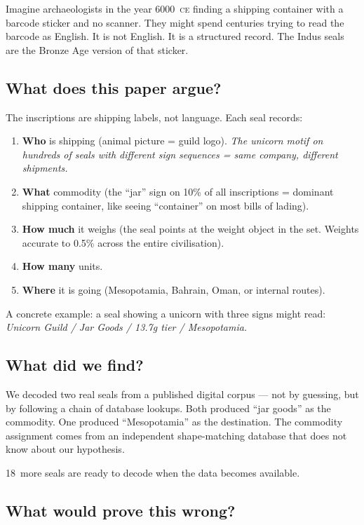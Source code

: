 Imagine archaeologists in the year 6000~\textsc{ce} finding a
shipping container with a barcode sticker and no scanner. They
might spend centuries trying to read the barcode as English. It is
not English. It is a structured record. The Indus seals are the
Bronze Age version of that sticker.

\subsection{What does this paper argue?}

The inscriptions are shipping labels, not language. Each seal
records:

\begin{enumerate}
\item \textbf{Who} is shipping (animal picture = guild logo).
  \textit{The unicorn motif on hundreds of seals with different
  sign sequences = same company, different shipments.}
\item \textbf{What} commodity (the ``jar'' sign on 10\% of all
  inscriptions = dominant shipping container, like seeing
  ``container'' on most bills of lading).
\item \textbf{How much} it weighs (the seal points at the weight
  object in the set. Weights accurate to 0.5\% across the entire
  civilisation).
\item \textbf{How many} units.
\item \textbf{Where} it is going (Mesopotamia, Bahrain, Oman, or
  internal routes).
\end{enumerate}

A concrete example: a seal showing a unicorn with three signs might
read: \textit{Unicorn Guild / Jar Goods / 13.7g tier /
Mesopotamia.}

\subsection{What did we find?}

We decoded two real seals from a published digital corpus ---
not by guessing, but by following a chain of database lookups.
Both produced ``jar goods'' as the commodity. One produced
``Mesopotamia'' as the destination.
The commodity assignment comes from an independent shape-matching
database that does not know about our hypothesis.

18~more seals are ready to decode when the data becomes available.

\subsection{What would prove this wrong?}

